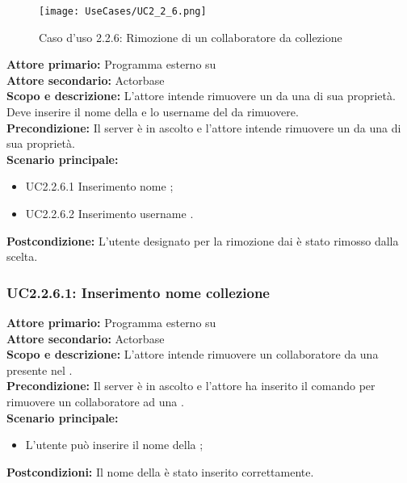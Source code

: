 \documentclass{scalatekids-article}
\begin{document}
\begin{figure}[H]
  \begin{center}
    \texttt{[image: UseCases/UC2\_2\_6.png]}
    \caption{Caso d'uso 2.2.6: Rimozione di un collaboratore da collezione}
  \end{center}
\end{figure}
\textbf{Attore primario:} Programma esterno su \\
\textbf{Attore secondario:} Actorbase\\
\textbf{Scopo e descrizione:} L'attore intende rimuovere un  da una  di sua proprietà. Deve inserire il nome della  e lo username del  da rimuovere.\\
\textbf{Precondizione:} Il server è in ascolto e l'attore intende rimuovere un  da una  di sua proprietà.\\
\textbf{Scenario principale:}
\begin{itemize}
\item UC2.2.6.1 Inserimento nome ;
\item UC2.2.6.2 Inserimento username .
\end{itemize}
\textbf{Postcondizione:} L'utente designato per la rimozione dai  è stato rimosso dalla  scelta.

\subsubsection{UC2.2.6.1: Inserimento nome collezione}

\textbf{Attore primario:} Programma esterno su \\
\textbf{Attore secondario:} Actorbase\\
\textbf{Scopo e descrizione:} L’attore intende rimuovere un collaboratore da una  presente nel .\\
\textbf{Precondizione:} Il server è in ascolto e l’attore ha inserito il comando per rimuovere un collaboratore ad una .\\
\textbf{Scenario principale:}
\begin{itemize}
\item L'utente può inserire il nome della ;
\end{itemize}
\textbf{Postcondizioni:} Il nome della  è stato inserito correttamente.
\end{document}
